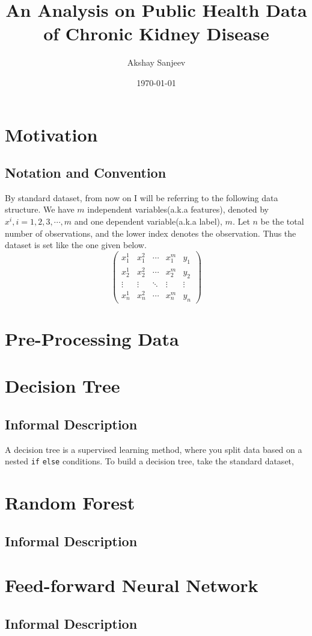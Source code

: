 \documentclass{article}
\title{An Analysis on Public Health Data of Chronic Kidney Disease}
\author{Akshay Sanjeev}
\date{\today}
\begin{document}
\maketitle

\section{Motivation}
\subsection{Notation and Convention}
By standard dataset, from now on I will be referring to the following data structure. 
We have $m$ independent variables(a.k.a features), denoted by $x^i, i = 1,2,3, \cdots,m$ 
and one dependent variable(a.k.a label), $m$. Let $n$ be the total number of observations, 
and the lower index denotes the observation. Thus the dataset is set like the one given below. 
\begin{equation}
    \begin{pmatrix}
        x^1_1 & x^2_1 & \cdots & x^m_1 & y_1 \\
        x^1_2 & x^2_2 & \cdots & x^m_2 & y_2 \\
        \vdots & \vdots & \ddots & \vdots & \vdots \\
        x^1_n & x^2_n & \cdots & x^m_n & y_n
    \end{pmatrix}
\end{equation}



\section{Pre-Processing Data}

\section{Decision Tree}
\subsection{Informal Description}
A decision tree is a supervised learning method, where you split data based 
on a nested \texttt{if} \texttt{else} conditions. To build a decision tree, take the 
standard dataset,

\section{Random Forest}
\subsection{Informal Description}


\section{Feed-forward Neural Network}
\subsection{Informal Description}
\end{document}
